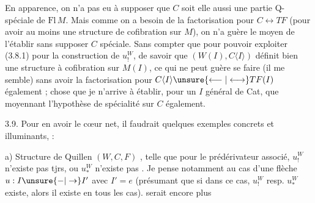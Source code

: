 En apparence, on n'a pas eu à supposer
que $C$ soit elle aussi une partie Q-spéciale de
$\mathrm{Fl}\,M$. Mais comme on a besoin de la factorisation
pour  $C\longleftrightarrow TF$ (pour avoir au
moins une structure de cofibration sur $M$),
on n'a guère le moyen de l'établir sans
supposer $C$ spéciale. Sans compter que pour
pouvoir exploiter (3.8.1) pour la construction
de $u^{W}_{!}$,      de savoir que
$(W(I),C\langle I\rangle)$ définit bien une structure
à cofibration sur $M(I)$, ce qui ne peut guère
se faire (il me semble) sans avoir la
factorisation pour $C\langle I\rangle\unsure{\longleftarrow|\longleftrightarrow}TF(I)$
également ; chose que je n'arrive à établir,
pour un $I$ général de Cat, que moyennant
l'hypothèse de spécialité sur $C$ également.

3.9. Pour en avoir le cœur net, il faudrait
quelques exemples concrets et illuminants,  :

a) Structure de Quillen  $(W,C,F)$ , telle que pour
le prédérivateur associé, $u^{W}_{!}$ n'existe pas tjrs,
ou $u^{W}_{*}$ n'existe pas . Je pense
notamment au cas d'une flèche $u:I\unsure{-|\to}I'$
avec $I'=e$ (présumant que si dans ce cas,
$u^{W}_{!}$ resp. $u^{W}_{*}$ existe, alors il existe en tous les
cas).    serait encore plus
